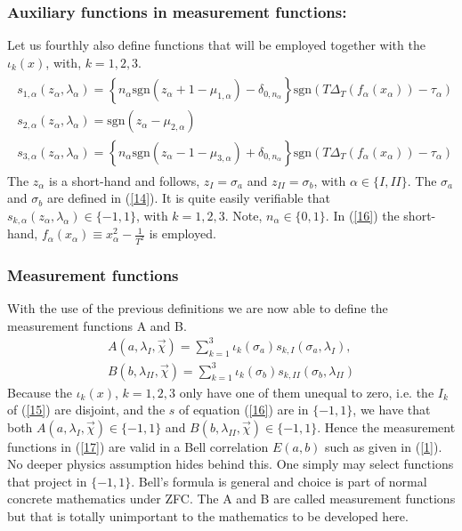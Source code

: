 \documentclass{appolb}
\newcommand{\sgn}{\text{sgn}}
\begin{document}
\subsubsection{Auxiliary functions in measurement functions: }
 Let us fourthly also define functions that will be employed together with the $\iota_k(x)$, with, $k=1,2,3$.
\begin{eqnarray}\label{16}
\begin{array}{ll}
s_{1,\alpha}(z_{\alpha},\lambda_{\alpha})=\left\{n_{\alpha}\sgn\left(z_{\alpha}+1-\mu_{1,\alpha} \right)-\delta_{0,n_{\alpha}} \right\}\sgn \left( T\Delta_T(f_{\alpha}(x_{\alpha}))-\tau_{\alpha} \right)\\
s_{2,\alpha}(z_{\alpha},\lambda_{\alpha})=\sgn\left(z_{\alpha}-\mu_{2,\alpha} \right) \\
s_{3,\alpha}(z_{\alpha},\lambda_{\alpha})=\left\{n_{\alpha}\sgn\left(z_{\alpha}-1-\mu_{3,\alpha} \right)+\delta_{0,n_{\alpha}} \right\}\sgn \left( T\Delta_T(f_{\alpha}(x_{\alpha}))-\tau_{\alpha} \right)
\end{array}
\end{eqnarray}
The $z_{\alpha}$ is a short-hand and follows, $z_{I}=\sigma_a$ and $z_{II}=\sigma_b$, with $\alpha \in \{I,II\}$. 
The $\sigma_a$ and $\sigma_b$ are defined in (\ref{14}). It is quite easily verifiable that $s_{k,\alpha}(z_{\alpha},\lambda_{\alpha}) \in \{-1,1\}$, with $k=1,2,3$. Note, $n_{\alpha} \in \{0,1\}$. In (\ref{16}) the short-hand, $f_{\alpha}(x_{\alpha})\equiv x_{\alpha}^2 -\frac{1}{T^2}$ is employed.

\subsubsection{Measurement functions}
With the use of the previous definitions we are now able to define the measurement functions A and B. 
\begin{eqnarray}\label{17}
A(a,\lambda_{I},\vec{\chi})=\sum_{k=1}^3 \iota_k(\sigma_a)s_{k,I}(\sigma_a,\lambda_{I}),\nonumber \\ B(b,\lambda_{II},\vec{\chi})=\sum_{k=1}^3 \iota_k(\sigma_b)s_{k,II}(\sigma_b,\lambda_{II})
\end{eqnarray}
Because the $\iota_k(x)$, $k=1,2,3$ only have one of them unequal to zero, i.e. the $I_k$ of (\ref{15}) are disjoint, and the $s$ of equation (\ref{16}) are in $\{-1,1\}$, we have that both  $A(a,\lambda_{I},\vec{\chi}) \in \{-1,1\}$ and $B(b,\lambda_{II},\vec{\chi}) \in \{-1,1\}$.
Hence the measurement functions in (\ref{17}) are valid in a Bell correlation $E(a,b)$ such as given in (\ref{1}). 
No deeper physics assumption hides behind this. One simply may select functions that project in $\{-1,1\}$. Bell's formula is general and choice is part of normal concrete mathematics under ZFC. The A and B are called measurement functions but that is totally unimportant to the mathematics to be developed here.
\end{document}
